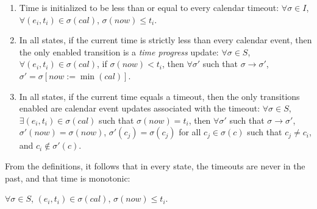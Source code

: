 \documentclass{llncs/llncs}
\begin{document}
\begin{enumerate}
\item \label{cal:a} Time is initialized to be less than or equal to every calendar timeout: $\forall \sigma \in I$, $\forall (e_i, t_i) \in \sigma(cal)$, $\sigma(now) \leq t_i$.


\item \label{cal:c} In all states, if the current time is strictly less than every calendar event, then the only enabled transition is a \emph{time progress} update: $\forall \sigma \in S$, $\forall (e_i, t_i) \in \sigma(cal)$, if $\sigma(now) < t_i$, then $\forall \sigma'$ such that $\sigma \rightarrow \sigma'$, $\sigma' = \sigma[now := \min(cal)]$.

\item \label{cal:d} In all states, if the current time equals a timeout, then the only transitions enabled are calendar event updates associated with the timeout: $\forall \sigma \in S$, $\exists (e_i, t_i) \in \sigma(cal)$ such that $\sigma(now) = t_i$, then $\forall \sigma'$ such that $\sigma \rightarrow \sigma'$, $\sigma'(now) = \sigma(now)$, $\sigma'(c_j) = \sigma(c_j)$ for all $c_j \in \sigma(c)$ such that $c_j \neq c_i$, and $c_i \notin \sigma'(c)$.

\end{enumerate}

From the definitions, it follows that in every state, the timeouts are never in the past, and that time is monotonic:

\begin{lemma}\label{lem:ft}
$\forall \sigma \in S$, $(e_i, t_i) \in \sigma(cal)$, $\sigma(now) \leq t_i$.
\end{lemma}
\end{document}

